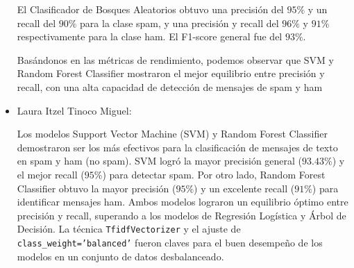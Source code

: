 \begin{itemize}
    El Clasificador de Bosques Aleatorios obtuvo una precisión del $95\%$ y un recall del $90\%$ para la clase spam, y una precisión y         recall del $96\%$ y $91\%$ respectivamente para la clase ham. El F1-score general fue del $93\%$.

    Basándonos en las métricas de rendimiento, podemos observar que SVM y Random Forest Classifier mostraron el mejor equilibrio entre         precisión y recall, con una alta capacidad de detección de mensajes de spam y ham

    \item Laura Itzel Tinoco Miguel:
    
    Los modelos Support Vector Machine (SVM) y Random Forest Classifier demostraron ser los más efectivos para la clasificación de mensajes de texto en spam y ham (no spam). SVM logró la mayor precisión general ($93.43\%$) y el mejor recall ($95\%$) para detectar spam. Por otro lado, Random Forest Classifier obtuvo la mayor precisión ($95\%$) y un excelente recall ($91\%$) para identificar mensajes ham. Ambos modelos lograron un equilibrio óptimo entre precisión y recall, superando a los modelos de Regresión Logística y Árbol de Decisión. La técnica \texttt{TfidfVectorizer} y el ajuste de \texttt{class\_weight='balanced'} fueron claves para el buen desempeño de los modelos en un conjunto de datos desbalanceado.

\end{itemize}
